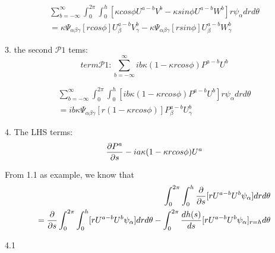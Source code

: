 \documentclass{Note}
\begin{document}
\begin{equation}
\begin{aligned}
\sum_{b=-\infty}^{\infty}\int_0^{2\pi} \int_0^h  [{\kappa cos\phi }U^{a-b}V^b-{\kappa sin\phi }U^{a-b}W^b]  r \psi_\alpha dr d\theta\\
=\kappa \Psi_{\alpha\beta\gamma}[rcos\phi]U_\beta^{a-b}V_\gamma^b-\kappa \Psi_{\alpha\beta\gamma}[r sin\phi]U_\beta^{a-b}W_\gamma^b
\end{aligned}
\end{equation}

3. the second $\mathcal{P}1$ tems:
$$term\mathcal{P}1: \sum_{b=-\infty}^{\infty} ib\kappa (1-\kappa rcos\phi)P^{a-b}U^{b}$$

\begin{equation}
\begin{aligned}
\sum_{b=-\infty}^{\infty}\int_0^{2\pi} \int_0^h  [ib\kappa (1-\kappa rcos\phi)P^{a-b}U^{b}]  r \psi_\alpha dr d\theta\\
=ib\kappa \Psi_{\alpha\beta\gamma}[r(1-\kappa r cos\phi)]P_\beta^{a-b}U_\gamma^{b}
\end{aligned}
\end{equation}

4. The LHS terms: 
$${\partial P^a\over {\partial s}}-ia\kappa(1-\kappa rcos\phi) U^a$$

From 1.1 as example, we know that
\begin{equation}
\begin{aligned}
\int_0^{2\pi}\int_0^h   {{\partial }\over {\partial s}}[ {r U^{a-b}} U^b\psi_\alpha] dr d\theta \\
={{\partial }\over {\partial s}}\int_0^{2\pi}\int_0^h   [ {r U^{a-b}} U^b\psi_\alpha] dr d\theta 
-\int_0^{2\pi}{dh(s)\over ds}[ {r U^{a-b}} U^b\psi_\alpha]_{r=h}d\theta\\
\end{aligned}
\end{equation}

4.1
\end{document}
